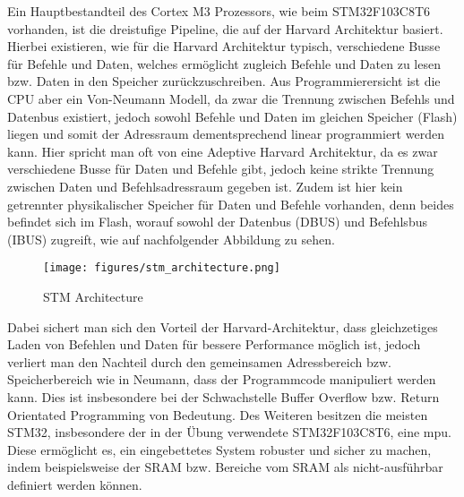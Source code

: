 \documentclass[a4paper,
DIV=13,
12pt,
BCOR=10mm,
department=FakIM,
oneside,
parskip=half,
automark,
listof=totocnumbered,
bibliography=totocnumbered,
acronym=totocnumbered
] {OTHRartcl}
\begin{document}
Ein Hauptbestandteil des Cortex M3 Prozessors, wie beim STM32F103C8T6 vorhanden, ist die dreistufige Pipeline, die auf der Harvard Architektur basiert.
Hierbei existieren, wie für die Harvard Architektur typisch, verschiedene Busse für Befehle und Daten, welches ermöglicht zugleich Befehle und Daten zu lesen bzw. Daten in den Speicher zurückzuschreiben.
Aus Programmierersicht ist die CPU aber ein Von-Neumann Modell, da zwar die Trennung zwischen Befehls und Datenbus existiert, jedoch sowohl Befehle und Daten im gleichen Speicher (Flash) liegen und
somit der Adressraum dementsprechend linear programmiert werden kann.
Hier spricht man oft von eine Adeptive Harvard Architektur, da es zwar verschiedene Busse für Daten und Befehle gibt, jedoch keine strikte Trennung zwischen Daten und Befehlsadressraum gegeben ist.
Zudem ist hier kein getrennter physikalischer Speicher für Daten und Befehle vorhanden, denn beides befindet sich im Flash, worauf sowohl der Datenbus (DBUS) und Befehlsbus (IBUS) zugreift, wie auf
nachfolgender Abbildung zu sehen.
\begin{figure}[ht!]
  \begin{center}
    \texttt{[image: figures/stm\_architecture.png]}
    \caption{STM Architecture}
    \label{Abbildung 1: STM Architecture}
  \end{center}
\end{figure}
Dabei sichert man sich den Vorteil der Harvard-Architektur, dass gleichzetiges Laden von Befehlen und Daten für bessere Performance möglich ist, jedoch
verliert man den Nachteil durch den gemeinsamen Adressbereich bzw. Speicherbereich wie in Neumann, dass der Programmcode manipuliert werden kann.
Dies ist insbesondere bei der Schwachstelle Buffer Overflow bzw. Return Orientated Programming von Bedeutung.
Des Weiteren besitzen die meisten STM32, insbesondere der in der Übung verwendete STM32F103C8T6, eine \ac{mpu}.
Diese ermöglicht es, ein eingebettetes System robuster und sicher zu machen, indem beispielsweise der SRAM bzw. Bereiche vom SRAM als nicht-ausführbar definiert werden können.
\end{document}
